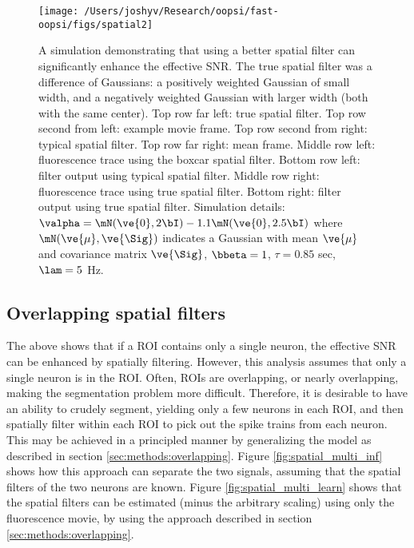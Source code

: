 \begin{figure}[h!]
\centering \texttt{[image: /Users/joshyv/Research/oopsi/fast-oopsi/figs/spatial2]}
\caption[spatial filtering can improve effective SNR]{A simulation demonstrating that using a better spatial filter can significantly enhance the effective SNR. The true spatial filter was a difference of Gaussians: a positively weighted Gaussian of small width, and a negatively weighted Gaussian with larger width (both with the same center).  Top row far left: true spatial filter.  Top row second from left: example movie frame. Top row second from right: typical spatial filter.   Top row far right: mean frame.  Middle row left: fluorescence trace using the boxcar spatial filter. Bottom row left: \foopsi filter output using typical spatial filter.  Middle row right: fluorescence trace using true spatial filter.  Bottom right: \foopsi filter output using true spatial filter. Simulation details: $\valpha=\mN(\ve{0},2 \bI)-1.1 \mN(\ve{0},2.5 \bI)$ where $\mN(\ve{\mu},\ve{\Sig})$ indicates a Gaussian with mean $\ve{\mu}$ and covariance matrix $\ve{\Sig}$, $\bbeta=1$, $\tau=0.85$ sec, $\lam=5$ Hz.} \label{fig:spatial} 
\end{figure}



\subsection{Overlapping spatial filters} \label{sec:results:overlapping}


The above shows that if a ROI contains only a single neuron, the effective SNR can be enhanced by spatially filtering.  However, this analysis assumes that only a single neuron is in the ROI.  Often, ROIs are overlapping, or nearly overlapping, making the segmentation problem more difficult.  Therefore, it is desirable to have an ability to crudely segment, yielding only a few neurons in each ROI, and then spatially filter within each ROI to pick out the spike trains from each neuron.  This may be achieved in a principled manner by generalizing the model as described in section \ref{sec:methods:overlapping}.  Figure \ref{fig:spatial_multi_inf} shows how this approach can separate the two signals, assuming that the spatial filters of the two neurons are known.  %
Figure \ref{fig:spatial_multi_learn} shows that the spatial filters can be estimated (minus the arbitrary scaling) using only the fluorescence movie, by using the approach described in section \ref{sec:methods:overlapping}.


